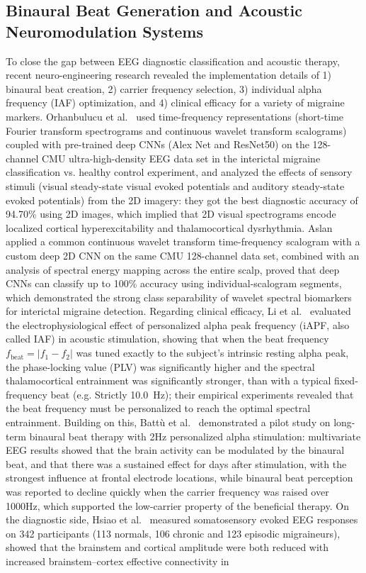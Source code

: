 \documentclass[12pt, a4paper]{report}
\begin{document}
\subsection{Binaural Beat Generation and Acoustic Neuromodulation Systems}
\label{subsec:lit_binaural_generation}
To close the gap between EEG diagnostic classification and acoustic therapy, recent neuro-engineering research revealed the implementation details of 1) binaural beat creation, 2) carrier frequency selection, 3) individual alpha frequency (IAF) optimization, and 4) clinical efficacy for a variety of migraine markers. Orhanbulucu et al.~\cite{orhanbulucu2023hybrid} used time-frequency representations (short-time Fourier transform spectrograms and continuous wavelet transform scalograms) coupled with pre-trained deep CNNs (Alex Net and ResNet50) on the 128-channel CMU ultra-high-density EEG data set in the interictal migraine classification vs. healthy control experiment, and analyzed the effects of sensory stimuli (visual steady-state visual evoked potentials and auditory steady-state evoked potentials) from the 2D imagery: they got the best diagnostic accuracy of 94.70\% using 2D images, which implied that 2D visual spectrograms encode localized cortical hyperexcitability and thalamocortical dysrhythmia. Aslan~\cite{aslan2023migrainecnn} applied a common continuous wavelet transform time-frequency scalogram with a custom deep 2D CNN on the same CMU 128-channel data set, combined with an analysis of spectral energy mapping across the entire scalp, proved that deep CNNs can classify up to 100\% accuracy using individual-scalogram segments, which demonstrated the strong class separability of wavelet spectral biomarkers for interictal migraine detection. Regarding clinical efficacy, Li et al.~\cite{li2023modulating} evaluated the electrophysiological effect of personalized alpha peak frequency (iAPF, also called IAF) in acoustic stimulation, showing that when the beat frequency $f_\text{beat} = \left|f_1 -f_2\right|$ was tuned exactly to the subject's intrinsic resting alpha peak, the phase-locking value (PLV) was significantly higher and the spectral thalamocortical entrainment was significantly stronger, than with a typical fixed-frequency beat (e.g. Strictly 10.0~Hz); their empirical experiments revealed that the beat frequency must be personalized to reach the optimal spectral entrainment. Building on this, Batt\`u et al.~\cite{battu2025longterm} demonstrated a pilot study on long-term binaural beat therapy with 2Hz personalized alpha stimulation: multivariate EEG results showed that the brain activity can be modulated by the binaural beat, and that there was a sustained effect for days after stimulation, with the strongest influence at frontal electrode locations, while binaural beat perception was reported to decline quickly when the carrier frequency was raised over 1000Hz, which supported the low-carrier property of the beneficial therapy. On the diagnostic side, Hsiao et al.~\cite{hsiao2024brainstem} measured somatosensory evoked EEG responses on 342 participants (113 normals, 106 chronic and 123 episodic migraineurs), showed that the brainstem and cortical amplitude were both reduced with increased brainstem--cortex effective connectivity in 
\end{document}
